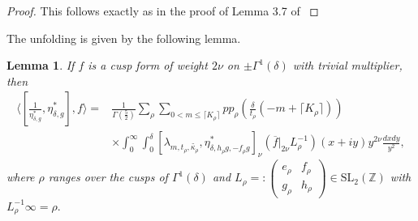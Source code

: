 \documentclass[10pt]{amsart}
\newtheorem{lemma}[theorem]{Lemma}
\theoremstyle{definition}
\theoremstyle{remark}
\numberwithin{equation}{section}
\newcommand{\lam}{\lambda}
\newcommand{\SL}{\mathrm{SL}}
\newcommand{\Z}{\mathbb Z}
\begin{document}
	\begin{proof}
		This follows exactly as in the proof of Lemma 3.7 of \cite{Gomez}
	\end{proof}
	
		The unfolding is given by the following lemma.
	
	\begin{lemma}\label{lem:LemUnfold}
		If $f$ is a cusp form of weight $2\nu$ on $\pm\Gamma^1(\delta)$ with trivial multiplier, then 
		\begin{align*}
		\langle[\frac{1}{\eta_{\delta,g}^\ast},\eta_{\delta,g}^\ast], f\rangle =  &\frac{1}{\Gamma(\frac{5}{2})}\sum\limits_\rho\sum\limits_{0<m\leq \lceil K_\rho\rceil } pp_\rho\left(\frac{\delta}{t_\rho}(-m+\lceil K_\rho\rceil)\right)\\
		&\times\int_0^\infty\int_0^\delta[\lam_{m,t_\rho,\widetilde{\kappa_\rho}},\eta_{\delta,h_\rho g,-f_\rho g}^\ast]_{\nu}(\overline{f}|_{2\nu}L_{\rho}^{-1})(x+iy)y^{2\nu}\frac{dxdy}{y^2},
		\end{align*}
		where $\rho$ ranges over the cusps of $\Gamma^1(\delta)$ and $L_\rho=:\begin{pmatrix}
			e_\rho & f_\rho \\
			g_\rho& h_\rho
		\end{pmatrix}\in\SL_2(\Z)$ with $L_\rho^{-1}\infty=\rho.$ 
	\end{lemma}
	
\end{document}

